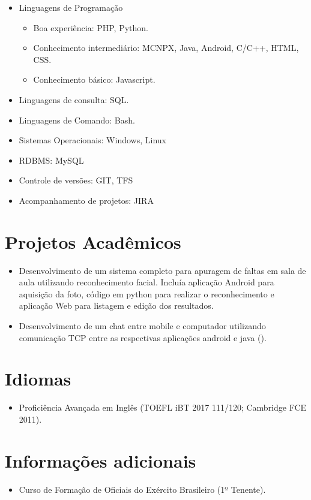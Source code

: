 \documentclass{tccv}
\begin{document}
    \begin{itemize}  
        \item Linguagens de Programação
            \begin{itemize}
                \item Boa experiência: PHP, Python.
                \item Conhecimento intermediário: MCNPX, Java, Android, C/C++, HTML, CSS.
                \item Conhecimento básico: Javascript.
            \end{itemize}
        \item Linguagens de consulta: SQL.
        \item Linguagens de Comando: Bash.
        \item Sistemas Operacionais: Windows, Linux
        \item RDBMS: MySQL 
        \item Controle de versões: GIT, TFS
        \item Acompanhamento de projetos: JIRA
    \end{itemize}

\section{Projetos Acadêmicos}
    
    \begin{itemize}
        \item Desenvolvimento de um sistema completo para apuragem de faltas em sala de aula utilizando reconhecimento facial. Incluía aplicação Android para aquisição da foto, código em python para realizar o reconhecimento e aplicação Web para listagem e edição dos resultados.
        \item Desenvolvimento de um chat entre mobile e computador utilizando comunicação TCP entre as respectivas aplicações android e java (\href{https://github.com/gdelfs/Messenger-Android-Computador}{\faCode}).
    \end{itemize}

\section{Idiomas}
    
    \begin{itemize}
        \item Proficiência Avançada em Inglês (TOEFL iBT 2017 111/120; Cambridge FCE 2011).
    \end{itemize}

\section{Informações adicionais}
    
    \begin{itemize}
        \item Curso de Formação de Oficiais do Exército Brasileiro (1º Tenente).
    \end{itemize}
    
\end{document}
